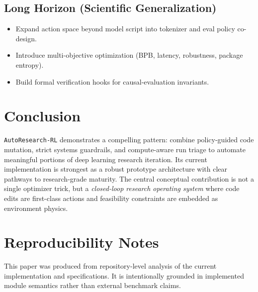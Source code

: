 \documentclass[11pt]{article}
\begin{document}
\subsection{Long Horizon (Scientific Generalization)}
\begin{itemize}[leftmargin=1.5em]
    \item Expand action space beyond model script into tokenizer and eval policy co-design.
    \item Introduce multi-objective optimization (BPB, latency, robustness, package entropy).
    \item Build formal verification hooks for causal-evaluation invariants.
\end{itemize}

\section{Conclusion}
\texttt{AutoResearch-RL} demonstrates a compelling pattern: combine policy-guided code mutation, strict systems guardrails, and compute-aware run triage to automate meaningful portions of deep learning research iteration. Its current implementation is strongest as a robust prototype architecture with clear pathways to research-grade maturity. The central conceptual contribution is not a single optimizer trick, but a \emph{closed-loop research operating system} where code edits are first-class actions and feasibility constraints are embedded as environment physics.

\section*{Reproducibility Notes}
This paper was produced from repository-level analysis of the current implementation and specifications. It is intentionally grounded in implemented module semantics rather than external benchmark claims.
\end{document}
